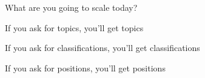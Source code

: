 \documentclass{mediumfoils}
\begin{document}
%
%
%
%
%
%
%
%
%
%
%
%
%

\centerline{What are you going to scale today?}


If you ask for topics, you'll get topics

If you ask for classifications, you'll get classifications

If you ask for positions, you'll get positions
\end{document}
